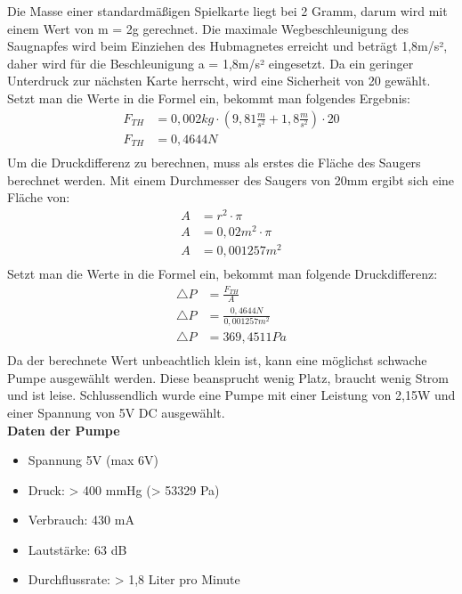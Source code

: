 Die Masse einer standardmäßigen  Spielkarte liegt bei 2 Gramm, darum wird mit einem Wert von m = 2g gerechnet.
Die maximale Wegbeschleunigung des Saugnapfes wird beim Einziehen des Hubmagnetes erreicht und
beträgt 1,8m/s²,
daher wird für die Beschleunigung a = 1,8m/s² eingesetzt.
Da ein geringer Unterdruck zur nächsten Karte herrscht, wird eine Sicherheit von 20 gewählt.
Setzt man die Werte in die Formel ein, bekommt man folgendes Ergebnis: \\
\begin{align*}
F_{TH} &= 0,002kg\cdot (9,81\frac{m}{s^{2}}+1,8\frac{m}{s^{2}})\cdot 20\\
F_{TH} &= 0,4644N\\
\end{align*}
Um die Druckdifferenz zu berechnen, muss als erstes die Fläche des Saugers berechnet werden.
Mit einem Durchmesser des Saugers von 20mm ergibt sich eine Fläche von:
\begin{align*}
A &= r^{2}\cdot \pi\\
A &= 0,02m^{2}\cdot \pi\\
A &= 0,001257m^{2}\\
\end{align*}
Setzt man die Werte in die Formel ein, bekommt man folgende Druckdifferenz:
\begin{align*}
\triangle P &= \frac{F_{TH}}{A}\\
\triangle P &= \frac{0,4644N}{0,001257m^{2}}\\
\triangle P &= 369,4511Pa\\
\end{align*}
Da der berechnete Wert unbeachtlich klein ist, kann eine möglichst schwache Pumpe ausgewählt werden.
Diese beansprucht wenig Platz, braucht wenig Strom und ist leise.
Schlussendlich wurde eine Pumpe mit einer Leistung von 2,15W und einer Spannung von 5V DC ausgewählt.\\
\textbf{Daten der Pumpe}
\begin{itemize}
    \item Spannung 5V (max 6V)
    \item Druck: > 400 mmHg (> 53329 Pa)
    \item Verbrauch: 430 mA
    \item Lautstärke: 63 dB
    \item Durchflussrate: > 1,8 Liter pro Minute
\end{itemize}



